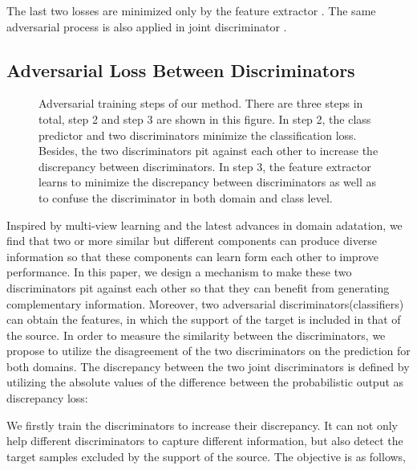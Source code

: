\documentclass{ecai}
\begin{document}
The last two losses are minimized only by the feature extractor . The same adversarial process is also applied in joint discriminator .

\setlength{\abovecaptionskip}{-0.1cm}  

\subsection{Adversarial Loss Between Discriminators}

\begin{figure*}[htbp]
\centering
{}
\caption{Adversarial training steps of our method. There are three steps in total, step 2 and step 3 are shown in this figure. In step 2, the class predictor and two discriminators minimize the classification loss. Besides, the two discriminators pit against each other to increase the discrepancy between discriminators. In step 3, the feature extractor learns to minimize the discrepancy between discriminators as well as to confuse the discriminator in both domain and class level.}
\label{train}
\end{figure*}

Inspired by multi-view learning\cite{b19} and the latest advances in domain adatation\cite{b24,b31}, we  find that two or more similar but different components can produce diverse information so that these components can learn form each other to improve performance. In this paper, we design a mechanism to make these two discriminators pit against each other so that they can benefit from generating complementary information. Moreover, two adversarial discriminators(classifiers) can obtain the features, in which the support of the target is included in that of the source. In order to measure the similarity between the discriminators, we propose to utilize the disagreement of the two discriminators on the prediction for both domains.
The discrepancy between the two joint discriminators is defined by utilizing the absolute values of the difference between the probabilistic output as discrepancy loss:


We firstly train the discriminators to increase their discrepancy. It can not only help different discriminators to capture different information, but also detect the target
samples excluded by the support of the source\cite{b24}. The objective is as follows,
\end{document}

